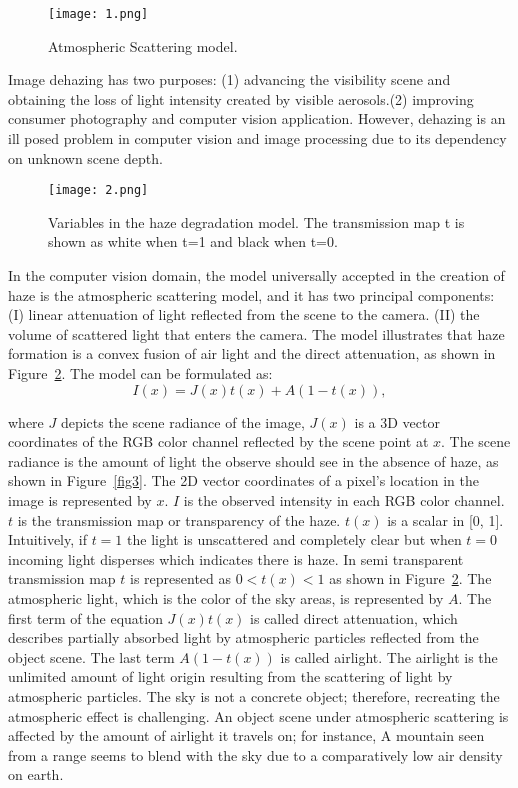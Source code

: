 \documentclass[doctor,english,listoffigures,listoftables]{thesis-uestc}
\begin{document}
\begin{figure}[H]
	\centering
	\texttt{[image: 1.png]}
	\caption{ Atmospheric Scattering model.}
	\label{fig1}
\end{figure}
Image dehazing has two purposes: (1) advancing the visibility scene and obtaining the loss of light intensity created by visible aerosols.(2) improving consumer photography and computer vision application. However, dehazing is an ill posed problem in computer vision and image processing due to its dependency on unknown scene depth. 
\begin{figure}[H]
	\centering
	\texttt{[image: 2.png]}
	\caption{ Variables in the haze degradation model. The transmission map t is shown as white when t=1 and black when t=0.}
	\label{fig2}
\end{figure}
In the computer vision domain, the model universally accepted in the creation of haze is the atmospheric scattering model, and it has two principal components: (I) linear attenuation of light reflected from the scene to the camera. (II) the volume of scattered light that enters the camera. The model illustrates that haze formation is a convex fusion of air light and the direct attenuation, as shown in Figure~\ref{fig2}. The model can be formulated as:
\begin{equation}\label{scattering}
	I{(x)}=J{(x)} t{(x)} + A(1-t{(x)}),
\end{equation}

where $J$ depicts the scene radiance of the image, $J{(x)}$ is a 3D vector coordinates of the RGB color channel reflected by the scene point at $x$. The scene radiance is the amount of light the observe should see in the absence of haze, as shown in Figure~\ref{fig3}. The 2D vector coordinates of a pixel's location in the image is represented by $x$. $I$ is the observed intensity in each RGB color channel. $t$ is the transmission map or transparency of the haze. $t{(x)}$ is a scalar in [0, 1]. Intuitively, if $t = 1 $ the light is unscattered and completely clear but when $t = 0 $ incoming light disperses which indicates there is haze. In semi transparent transmission map $t$ is represented as $0 < t{(x)} < 1$ as shown in Figure~\ref{fig2}. The atmospheric light, which is the color of the sky areas, is represented by $A$. The first term of the equation $J{(x)} t{(x)}$ is called direct attenuation, which describes partially absorbed light by atmospheric particles reflected from the object scene. The last term $A(1-t{(x)})$ is called airlight. The airlight is the unlimited amount of light origin resulting from the scattering of light by atmospheric particles. The sky is not a concrete object; therefore, recreating the atmospheric effect is challenging. An object scene under atmospheric scattering is affected by the amount of airlight it travels on; for instance, A mountain seen from a range seems to blend with the sky due to a comparatively low air density on earth. 
\end{document}
